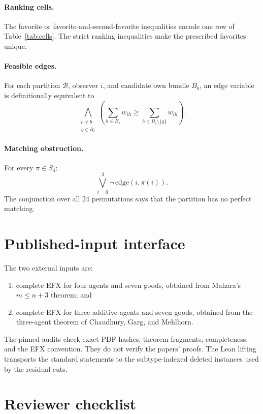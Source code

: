 \documentclass[11pt]{article}
\theoremstyle{definition}
\newcommand{\B}{\mathcal{B}}
\begin{document}
\paragraph{Ranking cells.}
The favorite or favorite-and-second-favorite inequalities encode one row of
Table~\ref{tab:cells}. The strict ranking inequalities make the prescribed
favorites unique.

\paragraph{Feasible edges.}
For each partition $\B$, observer $i$, and candidate own bundle $B_b$, an
edge variable is definitionally equivalent to
\[
  \bigwedge_{\substack{c\ne b\\g\in B_c}}
  \left(
    \sum_{h\in B_b}w_{ih}
    \ge
    \sum_{h\in B_c\setminus\{g\}}w_{ih}
  \right).
\]

\paragraph{Matching obstruction.}
For every $\pi\in S_4$:
\[
  \bigvee_{i=0}^{3}\neg\,\mathrm{edge}(i,\pi(i)).
\]
The conjunction over all 24 permutations says that the partition has no
perfect matching.

\section{Published-input interface}\label{app:published}

The two external inputs are:
\begin{enumerate}[leftmargin=2.1em]
  \item complete EFX for four agents and seven goods, obtained from Mahara's
  $m\le n+3$ theorem; and
  \item complete EFX for three additive agents and seven goods, obtained from
  the three-agent theorem of Chaudhury, Garg, and Mehlhorn.
\end{enumerate}

The pinned audits check exact PDF hashes, theorem fragments, completeness,
and the EFX convention. They do not verify the papers' proofs. The Lean
lifting transports the standard statements to the subtype-indexed deleted
instances used by the residual cuts.

\section{Reviewer checklist}\label{app:review}
\end{document}
